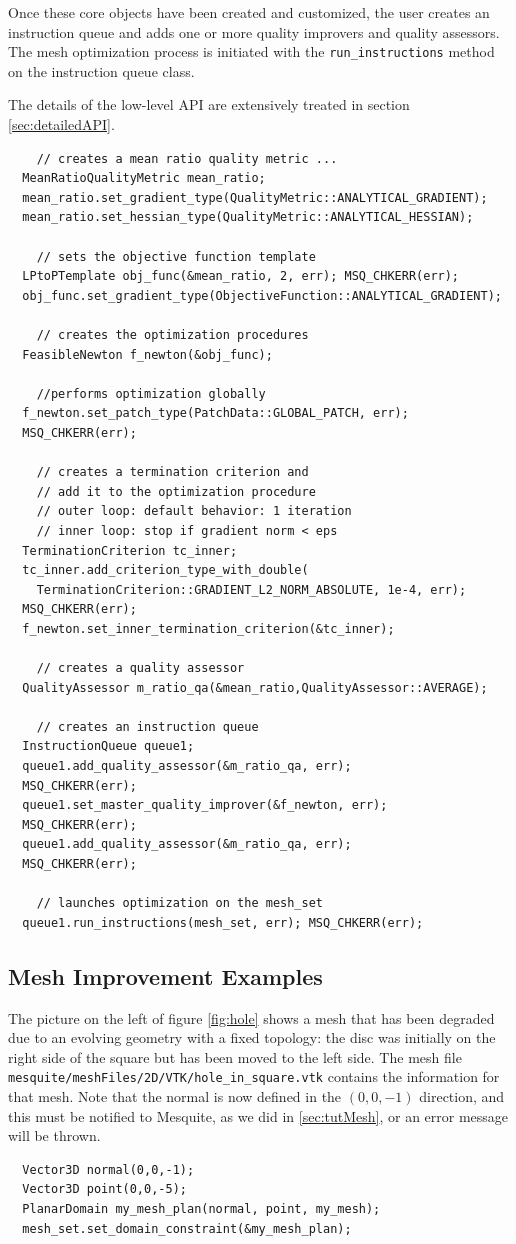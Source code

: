 \documentclass[letter]{report}
\begin{document}
Once these core objects have been created and customized, the user
creates an instruction queue and adds one or more quality improvers
and quality assessors.  The mesh optimization process is initiated
with the {\tt run\_instructions} method on the instruction queue
class.

The details of the low-level API are extensively treated in 
section \ref{sec:detailedAPI}.
\begin{verbatim}
    // creates a mean ratio quality metric ...
  MeanRatioQualityMetric mean_ratio;
  mean_ratio.set_gradient_type(QualityMetric::ANALYTICAL_GRADIENT);
  mean_ratio.set_hessian_type(QualityMetric::ANALYTICAL_HESSIAN);

    // sets the objective function template
  LPtoPTemplate obj_func(&mean_ratio, 2, err); MSQ_CHKERR(err);
  obj_func.set_gradient_type(ObjectiveFunction::ANALYTICAL_GRADIENT);
  
    // creates the optimization procedures
  FeasibleNewton f_newton(&obj_func);

    //performs optimization globally
  f_newton.set_patch_type(PatchData::GLOBAL_PATCH, err); 
  MSQ_CHKERR(err);

    // creates a termination criterion and 
    // add it to the optimization procedure
    // outer loop: default behavior: 1 iteration
    // inner loop: stop if gradient norm < eps
  TerminationCriterion tc_inner;
  tc_inner.add_criterion_type_with_double(
    TerminationCriterion::GRADIENT_L2_NORM_ABSOLUTE, 1e-4, err); 
  MSQ_CHKERR(err);
  f_newton.set_inner_termination_criterion(&tc_inner);

    // creates a quality assessor
  QualityAssessor m_ratio_qa(&mean_ratio,QualityAssessor::AVERAGE);

    // creates an instruction queue
  InstructionQueue queue1;
  queue1.add_quality_assessor(&m_ratio_qa, err); 
  MSQ_CHKERR(err);
  queue1.set_master_quality_improver(&f_newton, err); 
  MSQ_CHKERR(err);
  queue1.add_quality_assessor(&m_ratio_qa, err); 
  MSQ_CHKERR(err);

    // launches optimization on the mesh_set
  queue1.run_instructions(mesh_set, err); MSQ_CHKERR(err);
\end{verbatim} 

\subsection{Mesh Improvement Examples}

The picture on the left of figure \ref{fig:hole} shows a mesh that has been 
degraded due to an evolving geometry with a fixed topology:
the disc was initially on the right side of the square but has been moved to the left side. 
The mesh file \texttt{mesquite/meshFiles/2D/VTK/hole\_in\_square.vtk} contains the information for
that mesh. Note that the normal is now defined in the $(0,0,-1)$ direction, and this must be
notified to Mesquite, as we did in \ref{sec:tutMesh}, or an error message will be thrown. 
\begin{verbatim}
  Vector3D normal(0,0,-1);
  Vector3D point(0,0,-5);
  PlanarDomain my_mesh_plan(normal, point, my_mesh);
  mesh_set.set_domain_constraint(&my_mesh_plan);
\end{verbatim}
\end{document}
